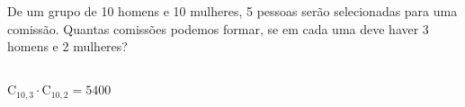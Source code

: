 \begin{ex}
 De um grupo de 10 homens e 10 mulheres, 5 pessoas serão selecionadas para uma comissão. Quantas comissões podemos formar, se em cada uma deve haver 3 homens e 2 mulheres?
 \begin{sol}
     \phantom{A} \\
    $ \mathrm{C}_{{10},3}  \cdot \mathrm{C}_{{10},2} = 5400$
 \end{sol}
\end{ex}